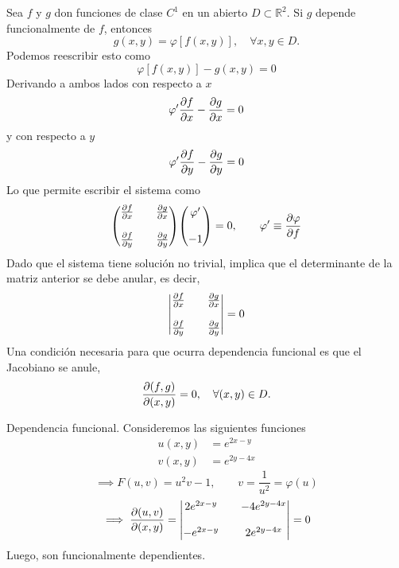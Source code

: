 \begin{ej}
	Sea $f$ y $g$ don funciones de clase $C^1$ en un abierto $D\subset \mathbb{R}^2$. Si $g$ depende funcionalmente de $f$, entonces
	\begin{equation}
  g(x,y)=\varphi[f(x,y)],\quad \forall x,y\in D.
\end{equation}
Podemos reescribir esto como
\begin{equation}
  \varphi[f(x,y)]- g(x,y)=0
\end{equation}
Derivando a ambos lados con respecto a $x$
\begin{equation}
  \varphi'\pdv{f}{x}-\pdv{g}{x}=0
\end{equation}
y con respecto a $y$
\begin{equation}
  \varphi'\pdv{f}{y}-\pdv{g}{y}=0
\end{equation}
Lo que permite escribir el sistema como
\begin{equation}
  \mqty(\pdv{f}{x}&&\pdv{g}{x}\\\\ \pdv{f}{y}&&\pdv{g}{y})\mqty(\varphi'\\\\-1)=0,\qquad \varphi'\equiv \pdv{\varphi}{f}
\end{equation}
Dado que el sistema tiene solución no trivial, implica que el determinante de la matriz anterior se debe anular, es decir,
\begin{equation}
   \mqty|\pdv{f}{x}&&\pdv{g}{x}\\\\ \pdv{f}{y}&&\pdv{g}{y}|=0
\end{equation}
Una condición necesaria para que ocurra dependencia funcional es que el Jacobiano se anule,
\begin{equation}
  \pdv{(f,g)}{(x,y)}=0,\quad \forall (x,y)\in D.
\end{equation}
\end{ej}

\begin{ej}
	Dependencia funcional. Consideremos las siguientes funciones
	\begin{align}
  u(x,y)&=e^{2x-y}\\
  v(x,y)&=e^{2y-4x}
\end{align}
\begin{equation}
  \implies F(u,v)=u^2v-1,\qquad v=\frac{1}{u^2}=\varphi(u)
\end{equation}
\begin{equation}
  \implies \pdv{(u,v)}{(x,y)}=\mqty|2e^{2x-y}&&-4e^{2y-4x}\\\\ -e^{2x-y}&&2e^{2y-4x}|=0
\end{equation}
Luego, son funcionalmente dependientes.
\end{ej}






